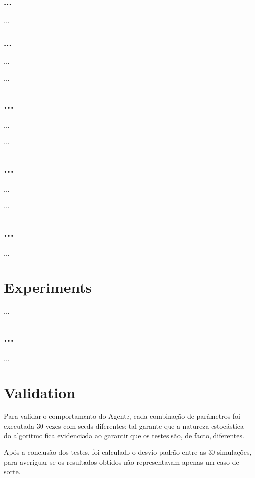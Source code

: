 \documentclass[a4paper]{article}
\begin{document}
\subsubsection{...}
\indent \indent ...

\subsubsection{...}
\indent \indent ...

...

\cleardoublepage
\subsection{...}
\indent \indent ...

...

\subsection{...}
\indent \indent ...

...

\subsection{...}
\indent \indent ...

\cleardoublepage

\section{Experiments}
\indent \indent ...

\cleardoublepage

\subsection{...}
\indent \indent ...

\cleardoublepage

\section{Validation}
\indent \indent Para validar o comportamento do Agente, cada combinação de parâmetros foi executada 30 vezes com seeds diferentes;
tal garante que a natureza estocástica do algoritmo fica evidenciada ao garantir que os testes são, de facto, diferentes.

Após a conclusão dos testes, foi calculado o desvio-padrão entre as 30 simulações,
para averiguar se os resultados obtidos não representavam apenas um caso de sorte.
\end{document}

